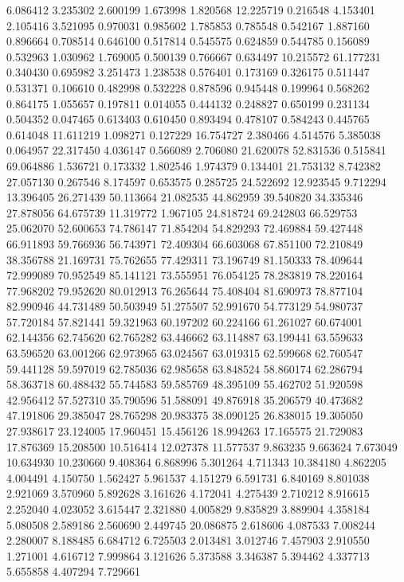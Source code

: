 6.086412
3.235302
2.600199
1.673998
1.820568
12.225719
0.216548
4.153401
2.105416
3.521095
0.970031
0.985602
1.785853
0.785548
0.542167
1.887160
0.896664
0.708514
0.646100
0.517814
0.545575
0.624859
0.544785
0.156089
0.532963
1.030962
1.769005
0.500139
0.766667
0.634497
10.215572
61.177231
0.340430
0.695982
3.251473
1.238538
0.576401
0.173169
0.326175
0.511447
0.531371
0.106610
0.482998
0.532228
0.878596
0.945448
0.199964
0.568262
0.864175
1.055657
0.197811
0.014055
0.444132
0.248827
0.650199
0.231134
0.504352
0.047465
0.613403
0.610450
0.893494
0.478107
0.584243
0.445765
0.614048
11.611219
1.098271
0.127229
16.754727
2.380466
4.514576
5.385038
0.064957
22.317450
4.036147
0.566089
2.706080
21.620078
52.831536
0.515841
69.064886
1.536721
0.173332
1.802546
1.974379
0.134401
21.753132
8.742382
27.057130
0.267546
8.174597
0.653575
0.285725
24.522692
12.923545
9.712294
13.396405
26.271439
50.113664
21.082535
44.862959
39.540820
34.335346
27.878056
64.675739
11.319772
1.967105
24.818724
69.242803
66.529753
25.062070
52.600653
74.786147
71.854204
54.829293
72.469884
59.427448
66.911893
59.766936
56.743971
72.409304
66.603068
67.851100
72.210849
38.356788
21.169731
75.762655
77.429311
73.196749
81.150333
78.409644
72.999089
70.952549
85.141121
73.555951
76.054125
78.283819
78.220164
77.968202
79.952620
80.012913
76.265644
75.408404
81.690973
78.877104
82.990946
44.731489
50.503949
51.275507
52.991670
54.773129
54.980737
57.720184
57.821441
59.321963
60.197202
60.224166
61.261027
60.674001
62.144356
62.745620
62.765282
63.446662
63.114887
63.199441
63.559633
63.596520
63.001266
62.973965
63.024567
63.019315
62.599668
62.760547
59.441128
59.597019
62.785036
62.985658
63.848524
58.860174
62.286794
58.363718
60.488432
55.744583
59.585769
48.395109
55.462702
51.920598
42.956412
57.527310
35.790596
51.588091
49.876918
35.206579
40.473682
47.191806
29.385047
28.765298
20.983375
38.090125
26.838015
19.305050
27.938617
23.124005
17.960451
15.456126
18.994263
17.165575
21.729083
17.876369
15.208500
10.516414
12.027378
11.577537
9.863235
9.663624
7.673049
10.634930
10.230660
9.408364
6.868996
5.301264
4.711343
10.384180
4.862205
4.004491
4.150750
1.562427
5.961537
4.151279
6.591731
6.840169
8.801038
2.921069
3.570960
5.892628
3.161626
4.172041
4.275439
2.710212
8.916615
2.252040
4.023052
3.615447
2.321880
4.005829
9.835829
3.889904
4.358184
5.080508
2.589186
2.560690
2.449745
20.086875
2.618606
4.087533
7.008244
2.280007
8.188485
6.684712
6.725503
2.013481
3.012746
7.457903
2.910550
1.271001
4.616712
7.999864
3.121626
5.373588
3.346387
5.394462
4.337713
5.655858
4.407294
7.729661
